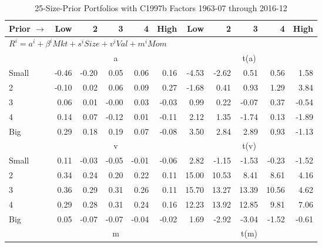 
\begin{table}[!ht]
\centering
\caption{25-Size-Prior Portfolios with C1997b Factors 1963-07 through 2016-12}
\begin{tabular}{lrrrrrrrrrr}
  \toprule
    Prior $\rightarrow$ & Low & 2 & 3 & 4 & High & Low & 2 & 3 & 4 & High \\ 
  \midrule
  \multicolumn{11}{l}{$R^i=a^i+\beta^iMkt+s^iSize+v^iVal+m^iMom$} \\

  
    
      & \multicolumn{5}{c}{a} & \multicolumn{5}{c}{t(a)}
    
    \\
      \cmidrule(r){2-6} \cmidrule(r){7-11}

    Small   & -0.46  & -0.20  & 0.05  & 0.06  & 0.16  & -4.53  & -2.62  & 0.51  & 0.56  & 1.58  \\
         2  & -0.10  & 0.02  & 0.06  & 0.09  & 0.27  & -1.68  & 0.41  & 0.93  & 1.29  & 3.84  \\
         3  & 0.06  & 0.01  & -0.00  & 0.03  & -0.03  & 0.99  & 0.22  & -0.07  & 0.37  & -0.54  \\
         4  & 0.14  & 0.07  & -0.12  & 0.01  & -0.11  & 2.12  & 1.35  & -1.74  & 0.13  & -1.89  \\
    Big     & 0.29  & 0.18  & 0.19  & 0.07  & -0.08  & 3.50  & 2.84  & 2.89  & 0.93  & -1.13  \\

  
    
      & \multicolumn{5}{c}{v} & \multicolumn{5}{c}{t(v)}
    
    \\
      \cmidrule(r){2-6} \cmidrule(r){7-11}

    Small   & 0.11  & -0.03  & -0.05  & -0.01  & -0.06  & 2.82  & -1.15  & -1.53  & -0.23  & -1.52  \\
         2  & 0.34  & 0.24  & 0.20  & 0.22  & 0.11  & 15.00  & 10.53  & 8.41  & 8.61  & 4.16  \\
         3  & 0.36  & 0.29  & 0.31  & 0.26  & 0.11  & 15.70  & 13.27  & 13.39  & 10.56  & 4.62  \\
         4  & 0.29  & 0.28  & 0.31  & 0.24  & 0.16  & 12.23  & 13.92  & 12.85  & 9.81  & 7.06  \\
    Big     & 0.05  & -0.07  & -0.07  & -0.04  & -0.02  & 1.69  & -2.92  & -3.04  & -1.52  & -0.61  \\

  
    
      & \multicolumn{5}{c}{m} & \multicolumn{5}{c}{t(m)}
    

\end{tabular}
\end{table}

